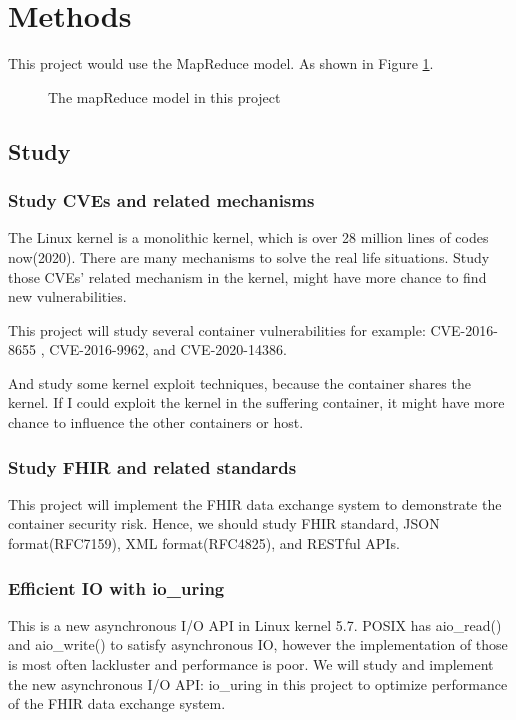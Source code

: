 \documentclass[12pt,a4paper]{IEEEconf}
\begin{document}

\section{Methods}
This project would use the MapReduce model. As shown in Figure \ref*{Fig:model}.

\begin{figure}
  \centering
  \caption[]{The mapReduce model in this project}
  \label{Fig:model}
\end{figure}

\subsection{Study}
\subsubsection{Study CVEs and related mechanisms}
The Linux kernel is a monolithic kernel, which is over 28 million lines of codes now(2020). There
are many mechanisms to solve the real life situations. Study those CVEs' related mechanism in the
kernel, might have more chance to find new vulnerabilities.

This project will study several container vulnerabilities for example: CVE-2016-8655
\cite{CVE-2016-8655}, CVE-2016-9962\cite{CVE-2016-9962}, and CVE-2020-14386\cite{CVE-2020-14386}.

And study some kernel exploit techniques\cite{Kernel_exploitation}, because the container shares
the kernel. If I could exploit the kernel in the suffering container, it might have more chance
to influence the other containers or host.

\subsubsection{Study FHIR and related standards}
This project will implement the FHIR\cite{FHIR_home} data exchange system to demonstrate the container
security risk. Hence, we should study FHIR standard, JSON format(RFC7159), XML format(RFC4825), and
RESTful APIs.

\subsubsection{Efficient IO with io\_uring}\cite{Efficient_IO_uring}
This is a new asynchronous I/O API in Linux kernel 5.7. POSIX has aio\_read() and aio\_write() to
satisfy asynchronous IO, however the implementation of those is most often lackluster and performance
is poor. We will study and implement the new asynchronous I/O API: io\_uring in this project to
optimize performance of the FHIR data exchange system.
\end{document}
